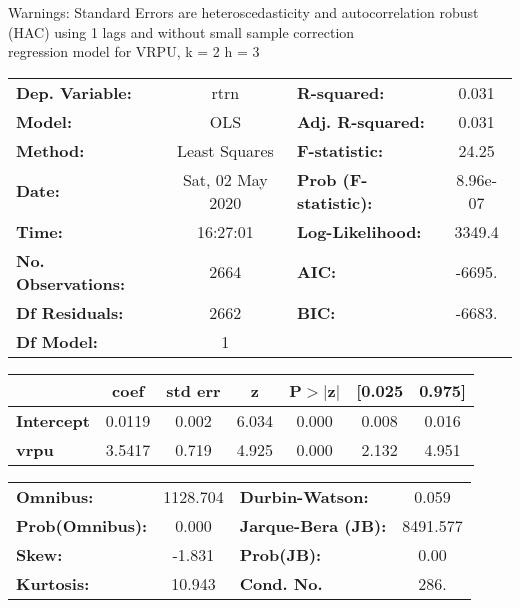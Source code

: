 Warnings: \newline
 [1] Standard Errors are heteroscedasticity and autocorrelation robust (HAC) using 1 lags and without small sample correction\\ 

regression model for VRPU, k = 2 h = 3\begin{center}
\begin{tabular}{lclc}
\toprule
\textbf{Dep. Variable:}    &       rtrn       & \textbf{  R-squared:         } &     0.031   \\
\textbf{Model:}            &       OLS        & \textbf{  Adj. R-squared:    } &     0.031   \\
\textbf{Method:}           &  Least Squares   & \textbf{  F-statistic:       } &     24.25   \\
\textbf{Date:}             & Sat, 02 May 2020 & \textbf{  Prob (F-statistic):} &  8.96e-07   \\
\textbf{Time:}             &     16:27:01     & \textbf{  Log-Likelihood:    } &    3349.4   \\
\textbf{No. Observations:} &        2664      & \textbf{  AIC:               } &    -6695.   \\
\textbf{Df Residuals:}     &        2662      & \textbf{  BIC:               } &    -6683.   \\
\textbf{Df Model:}         &           1      & \textbf{                     } &             \\
\bottomrule
\end{tabular}
\begin{tabular}{lcccccc}
                   & \textbf{coef} & \textbf{std err} & \textbf{z} & \textbf{P$> |$z$|$} & \textbf{[0.025} & \textbf{0.975]}  \\
\midrule
\textbf{Intercept} &       0.0119  &        0.002     &     6.034  &         0.000        &        0.008    &        0.016     \\
\textbf{vrpu}      &       3.5417  &        0.719     &     4.925  &         0.000        &        2.132    &        4.951     \\
\bottomrule
\end{tabular}
\begin{tabular}{lclc}
\textbf{Omnibus:}       & 1128.704 & \textbf{  Durbin-Watson:     } &    0.059  \\
\textbf{Prob(Omnibus):} &   0.000  & \textbf{  Jarque-Bera (JB):  } & 8491.577  \\
\textbf{Skew:}          &  -1.831  & \textbf{  Prob(JB):          } &     0.00  \\
\textbf{Kurtosis:}      &  10.943  & \textbf{  Cond. No.          } &     286.  \\
\bottomrule
\end{tabular}
\end{center}


